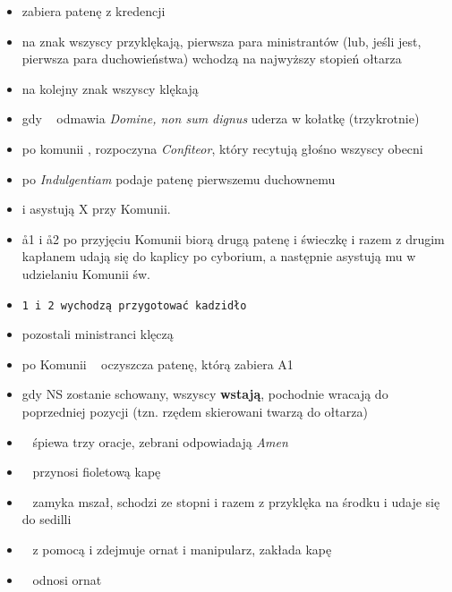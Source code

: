 \begin{itemize}
            \begin{center}
                  (stopnie ołtarza) \smallskip\\
                  duchowieństwo \smallskip\\
                  ~~ \smallskip\\
                  \aa2~~\aa2 \smallskip\\
                  ministranci
            \end{center}

      \item {} zabiera patenę z kredencji
      \item na znak  wszyscy przyklękają, pierwsza para ministrantów (lub,
            jeśli jest, pierwsza para duchowieństwa) wchodzą na najwyższy stopień
            ołtarza
      \item na kolejny znak wszyscy klękają
      \item gdy \ii~ odmawia \textit{Domine, non sum dignus}  uderza w
            kołatkę (trzykrotnie)
      \item po komunii \ii,  rozpoczyna \textit{Confiteor}, który recytują
            głośno wszyscy obecni
      \item po \textit{Indulgentiam}  podaje patenę pierwszemu duchownemu
      \item {} i  asystują X przy Komunii.
      \item \aa1 i \aa2 po przyjęciu Komunii biorą drugą patenę i świeczkę i
            razem z drugim kapłanem udają się do kaplicy po cyborium, a
            następnie asystują mu w udzielaniu Komunii św.
      \item \tt1 i \tt2 wychodzą przygotować kadzidło
      \item pozostali ministranci klęczą
      \item po Komunii \ii~ oczyszcza patenę, którą zabiera A1
      \item gdy NS zostanie schowany, wszyscy \textbf{wstają}, pochodnie wracają
            do poprzedniej pozycji (tzn. rzędem skierowani twarzą do ołtarza)
      \item \ii~ śpiewa trzy oracje, zebrani odpowiadają \textit{Amen}
      \item \zz~ przynosi fioletową kapę
      \item \ii~ zamyka mszał, schodzi ze stopni i razem z  przyklęka na
            środku i udaje się do sedilli
      \item \ii~ z pomocą  i  zdejmuje ornat i manipularz, zakłada kapę
      \item \zz~ odnosi ornat
\end{itemize}

